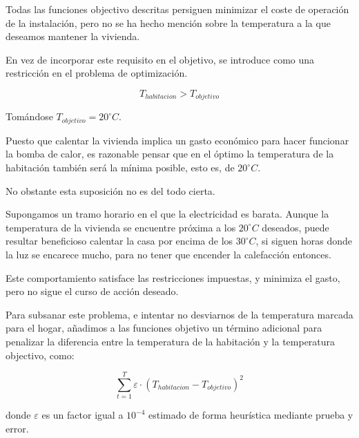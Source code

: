 Todas las funciones objectivo descritas persiguen minimizar el coste de
operación de la instalación, pero no se ha hecho mención sobre la temperatura a
la que deseamos mantener la vivienda.

En vez de incorporar este requisito en el objetivo, se introduce como una
restricción en el problema de optimización.

\begin{equation}
	T_{habitacion} > T_{objetivo}
\end{equation}

Tomándose $T_{objetivo} = 20 ^\circ C$.

Puesto que calentar la vivienda implica un gasto económico para hacer funcionar la bomba de calor,
es razonable pensar que en el óptimo la temperatura de la habitación también será la mínima posible,
esto es, de $20 ^\circ C$.

No obstante esta suposición no es del todo cierta.

Supongamos un tramo horario en el que la electricidad es barata. Aunque la
temperatura de la vivienda se encuentre próxima a los $20 ^\circ C$ deseados,
puede resultar beneficioso calentar la casa por encima de los $30 ^\circ C$, si
siguen horas donde la luz se encarece mucho, para no tener que encender la
calefacción entonces.

Este comportamiento satisface las restricciones impuestas, y minimiza el gasto, pero
no sigue el curso de acción deseado.

Para subsanar este problema, e intentar no desviarnos de la temperatura marcada para
el hogar, añadimos a las funciones objetivo un término adicional para penalizar
la diferencia entre la temperatura de la habitación y la temperatura objectivo, como:

\begin{equation} \label{eq:temperature_penalization}
	\sum_{t=1}^{T} \varepsilon \cdot (T_{habitacion} - T_{objetivo})^2
\end{equation}

donde $\varepsilon$ es un factor igual a $10^{-4}$ estimado de forma heurística
mediante prueba y error.
